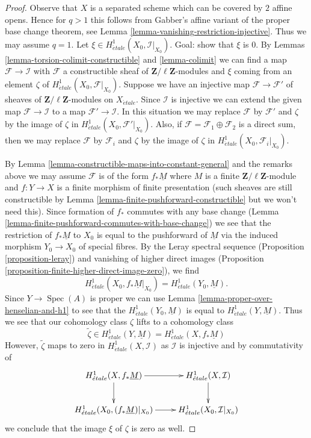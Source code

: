 \documentclass[10pt,a4paper]{amsart}
\theoremstyle{plain}
\theoremstyle{definition}
\theoremstyle{remark}
\numberwithin{equation}{subsection}
\def\Spec{\mathop{\mathrm{Spec}}}
\def\etale{{\acute{e}tale}}
\begin{document}
\begin{proof}
Observe that $X$ is a separated scheme which can be covered by $2$
affine opens. Hence for $q > 1$ this follows from Gabber's affine
variant of the proper base change theorem, see
Lemma \ref{lemma-vanishing-restriction-injective}.
Thus we may assume $q = 1$. Let
$\xi \in H^1_\etale(X_0, \mathcal{I}|_{X_0})$.
Goal: show that $\xi$ is $0$.
By Lemmas \ref{lemma-torsion-colimit-constructible} and
\ref{lemma-colimit} we can find a map $\mathcal{F} \to \mathcal{I}$
with $\mathcal{F}$ a constructible sheaf of
$\mathbf{Z}/\ell\mathbf{Z}$-modules
and $\xi$ coming from an element $\zeta$ of
$H^1_\etale(X_0, \mathcal{F}|_{X_0})$. Suppose we have an injective map
$\mathcal{F} \to \mathcal{F}'$ of sheaves of
$\mathbf{Z}/\ell\mathbf{Z}$-modules on $X_\etale$.
Since $\mathcal{I}$ is injective we can extend the given map
$\mathcal{F} \to \mathcal{I}$ to a map $\mathcal{F}' \to \mathcal{I}$.
In this situation we may replace $\mathcal{F}$ by $\mathcal{F}'$
and $\zeta$ by the image of $\zeta$ in $H^1_\etale(X_0, \mathcal{F}'|_{X_0})$.
Also, if $\mathcal{F} = \mathcal{F}_1 \oplus \mathcal{F}_2$ is a direct sum,
then we may replace $\mathcal{F}$ by $\mathcal{F}_i$
and $\zeta$ by the image of $\zeta$ in $H^1_\etale(X_0, \mathcal{F}_i|_{X_0})$.

\medskip\noindent
By Lemma \ref{lemma-constructible-maps-into-constant-general}
and the remarks above we may assume $\mathcal{F}$
is of the form $f_*\underline{M}$ where $M$ is a finite
$\mathbf{Z}/\ell\mathbf{Z}$-module
and $f : Y \to X$ is a finite morphism of finite presentation
(such sheaves are still constructible by
Lemma \ref{lemma-finite-pushforward-constructible}
but we won't need this).
Since formation of $f_*$ commutes with any base change
(Lemma \ref{lemma-finite-pushforward-commutes-with-base-change})
we see that the restriction of $f_*\underline{M}$ to $X_0$ is
equal to the pushforward of $\underline{M}$ via the induced morphism
$Y_0 \to X_0$ of special fibres. By the Leray spectral sequence
(Proposition \ref{proposition-leray})
and vanishing of higher direct images
(Proposition \ref{proposition-finite-higher-direct-image-zero}),
we find
$$
H^1_\etale(X_0, f_*\underline{M}|_{X_0}) = H^1_\etale(Y_0, \underline{M}).
$$
Since $Y \to \Spec(A)$ is proper we can use
Lemma \ref{lemma-proper-over-henselian-and-h1} to see that
the $H^1_\etale(Y_0, \underline{M})$ is equal to
$H^1_\etale(Y, \underline{M})$. Thus we see that our cohomology
class $\zeta$ lifts to a cohomology class
$$
\tilde\zeta \in H^1_\etale(Y, \underline{M}) = H^1_\etale(X, f_*\underline{M})
$$
However, $\tilde \zeta$ maps to zero in
$H^1_\etale(X, \mathcal{I})$ as $\mathcal{I}$ is injective
and by commutativity of
$$
\xymatrix{
H^1_\etale(X, f_*\underline{M}) \ar[r] \ar[d] &
H^1_\etale(X, \mathcal{I}) \ar[d] \\
H^1_\etale(X_0, (f_*\underline{M})|_{X_0}) \ar[r] &
H^1_\etale(X_0, \mathcal{I}|_{X_0})
}
$$
we conclude that the image $\xi$ of $\zeta$ is zero as well.
\end{proof}
\end{document}
